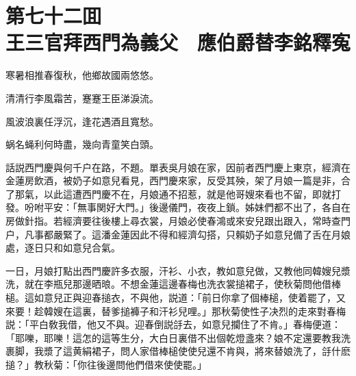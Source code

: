 
\chapter*{第七十二囬　\\王三官拜西門為義父　應伯爵替李銘釋寃}


\begin{myquote}
寒暑相推春復秋，他鄉故國兩悠悠。

清清行李風霜苦，蹇蹇王臣涕淚流。

風波浪裏任浮沉，逢花遇酒且寬愁。

蜗名蝇利何時盡，幾向青童笑白頭。
\end{myquote}

話説西門慶與何千户在路，不題。單表吳月娘在家，因前者西門慶上東京，經濟在金蓮房飲酒，被奶子如意兒看見，西門慶來家，反受其殃，架了月娘一篇是非，合了那氣，以此這遭西門慶不在，月娘通不招惹，就是他哥嫂來看也不留，即就打發。吩咐平安：「無事関好大門。」後邊儀門，夜夜上鎖。姊妹們都不出了，各自在房做針指。若經濟要往後樓上尋衣裳，月娘必使春鴻或來安兒跟出跟入，常時查門户，凡事都嚴緊了。這潘金蓮因此不得和經濟勾搭，只賴奶子如意兒備了舌在月娘處，逐日只和如意兒合氣。

一日，月娘打點出西門慶許多衣服，汗衫、小衣，教如意兒做，又教他同韓嫂兒漿洗，就在李瓶兒那邊晒㫰。不想金蓮這邊春梅也洗衣裳搥裙子，使秋菊問他借棒槌。這如意兒正與迎春搥衣，不與他，説道：「前日你拿了個棒槌，使着罷了，又來要！趁韓嫂在這裏，替爹搥褲子和汗衫兒哩。」那秋菊使性子决烈的走來對春梅説：「平白敎我借，他又不與。迎春倒説㧱去，如意兒攔住了不肯。」春梅便道：「耶嚛，耶嚛！這怎的這等生分，大白日裏借不出個乾燈盞來？娘不定還要教我洗裹脚，我漿了這黄絹裙子，問人家借棒槌使使兒還不肯與，將來替娘洗了，㧱什麽搥？」教秋菊：「你往後邊問他們借來使使罷。」

